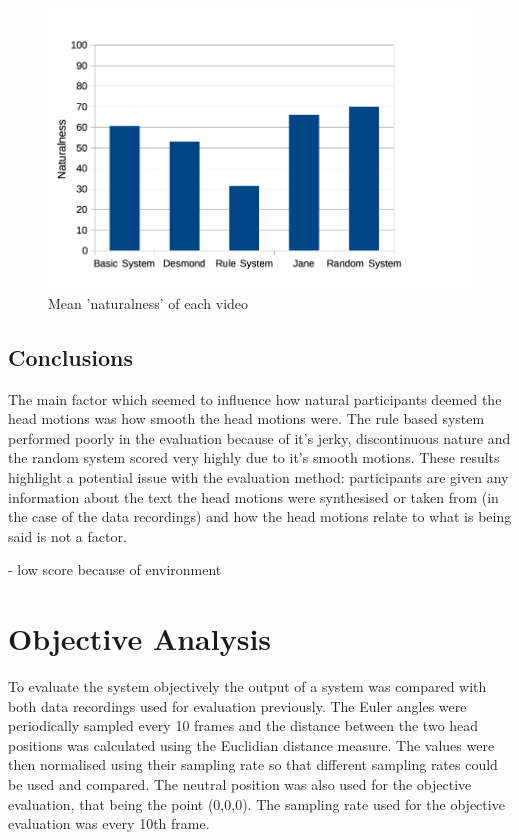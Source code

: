 \documentclass[bsc,frontabs,twoside,singlespacing,parskip]{infthesis}
\begin{document}
\begin{figure}
	\centering
	\includegraphics[width=1.0\textwidth]{chart.png}
	\caption{Mean 'naturalness' of each video}
\end{figure}

\subsection{Conclusions}

The main factor which seemed to influence how natural participants deemed the head motions was how smooth the head motions were. The rule based system performed poorly in the evaluation because of it's jerky, discontinuous nature and the random system scored very highly due to it's smooth motions. These results highlight a potential issue with the evaluation method: participants are given any information about the text the head motions were synthesised or taken from (in the case of the data recordings) and how the head motions relate to what is being said is not a factor. 

- low score because of environment

\section{Objective Analysis}

To evaluate the system objectively the output of a system was compared with both data recordings used for evaluation previously. The Euler angles were periodically sampled every 10 frames and the distance between the two head positions was calculated using the Euclidian distance measure. The values were then normalised using their sampling rate so that different sampling rates could be used and compared. The neutral position was also used for the objective evaluation, that being the point (0,0,0). The sampling rate used for the objective evaluation was every 10th frame. 
\end{document}
